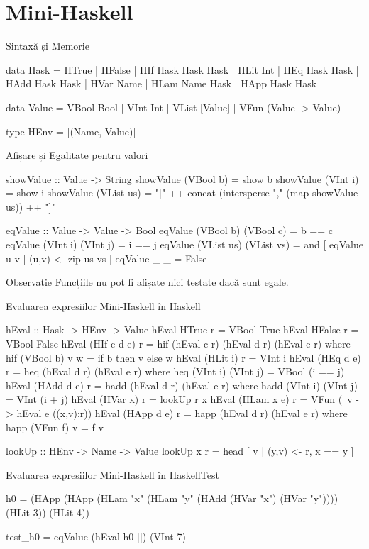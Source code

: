 \documentclass[xcolor=pdftex,romanian,colorlinks]{beamer}
\begin{document}
\section{Mini-Haskell}

\begin{frame}[fragile]{Sintaxă și Memorie}
\begin{asciihs}
  data   Hask   =   HTrue
                |   HFalse
                |   HIf Hask Hask Hask
                |   HLit Int
                |   HEq Hask Hask
                |   HAdd Hask Hask
                |   HVar Name
                |   HLam Name Hask
                |   HApp Hask Hask

  data   Value  =   VBool Bool
                |   VInt Int
                |   VList [Value]
                |   VFun (Value -> Value)

  type   HEnv   =   [(Name, Value)]
\end{asciihs}
\end{frame}
\begin{frame}[fragile]{Afișare și Egalitate pentru valori}
\begin{asciihs}
showValue :: Value -> String
showValue (VBool b)   = show b
showValue (VInt i)    = show i
showValue  (VList us) =
  "[" ++ concat (intersperse "," (map showValue us)) ++ "]"

eqValue :: Value -> Value -> Bool
eqValue (VBool b) (VBool c)   = b == c
eqValue (VInt i) (VInt j)     = i == j
eqValue (VList us) (VList vs) =
  and [ eqValue u v | (u,v) <- zip us vs ]
eqValue _ _                   = False
\end{asciihs}

\begin{block}{Observație}
Funcțiile nu pot fi afișate nici testate dacă sunt egale.
\end{block}
\end{frame}
\begin{frame}[fragile]{Evaluarea expresiilor Mini-Haskell în Haskell}
\begin{asciihs}
  hEval :: Hask -> HEnv -> Value
  hEval HTrue r         = VBool True
  hEval HFalse r        = VBool False
  hEval (HIf c d e) r   =
    hif (hEval c r) (hEval d r) (hEval e r)
    where hif (VBool b) v w = if b then v else w
  hEval (HLit i) r      = VInt i
  hEval (HEq d e) r     = heq (hEval d r) (hEval e r)
    where heq (VInt i) (VInt j) = VBool (i == j)
  hEval (HAdd d e) r    = hadd (hEval d r) (hEval e r)
    where hadd (VInt i) (VInt j) = VInt (i + j)
  hEval (HVar x) r      = lookUp r x
  hEval (HLam x e) r    = VFun (\ v -> hEval e ((x,v):r))
  hEval (HApp d e) r    = happ (hEval d r) (hEval e r)
    where happ (VFun f) v = f v

  lookUp :: HEnv -> Name -> Value
  lookUp x r = head [ v | (y,v) <- r, x == y ]
\end{asciihs}
\end{frame}
\begin{frame}[fragile]{Evaluarea expresiilor Mini-Haskell în Haskell}{Test}
\begin{asciihs}
  h0 =
   (HApp
     (HApp
       (HLam "x" (HLam "y" (HAdd (HVar "x") (HVar "y"))))
       (HLit 3))
     (HLit 4))

  test_h0 = eqValue (hEval h0 []) (VInt 7)
\end{asciihs}
\end{frame}
\end{document}

